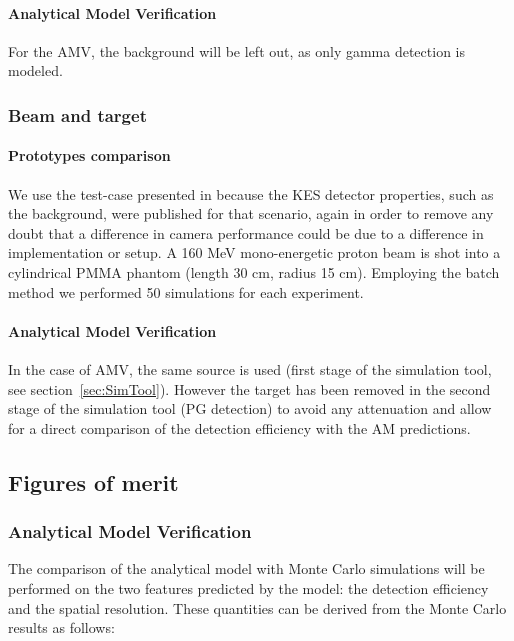 \documentclass[a4paper,english,12pt]{article}
\begin{document}
\paragraph{Analytical Model Verification}

For the AMV, the background will be left out, as only gamma detection is modeled.

\subsubsection{Beam and target}

\paragraph{Prototypes comparison}

We use the test-case presented in \cite{Perali2014} because the KES detector properties, such as the background, were published for that scenario, again in order to remove any doubt that a difference in camera performance could be due to a difference in implementation or setup. A 160 MeV mono-energetic proton beam is shot into a cylindrical PMMA phantom (length 30 cm, radius 15 cm). Employing the batch method we performed 50 simulations for each experiment.

\paragraph{Analytical Model Verification}

In the case of AMV, the same source is used (first stage of the simulation tool, see section~\ref{sec:SimTool}). However the target has been removed in the second stage of the simulation tool (PG detection) to avoid any attenuation and allow for a direct comparison of the detection efficiency with the AM predictions.

\subsection{Figures of merit}\label{figmerit}

\subsubsection{Analytical Model Verification}

The comparison of the analytical model with Monte Carlo simulations will be performed on the two features predicted by the model: the detection efficiency and the spatial resolution. These quantities can be derived from the Monte Carlo results as follows:
\end{document}
